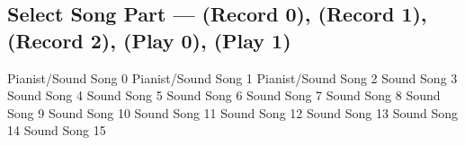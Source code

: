 \subsection[Select Song Part]{Select Song Part --- \UiKey{\I}\UiKey{\REC} (Record 0), \UiKey{\II}\UiKey{\REC} (Record 1), \UiKey{\I}\UiKey{\II}\UiKey{\REC} (Record 2), \UiKey{\I}\UiKey{\PL} (Play 0), \UiKey{\II}\UiKey{\PL} (Play 1)}
Pianist/Sound Song 0
Pianist/Sound Song 1
Pianist/Sound Song 2
Sound Song 3
Sound Song 4
Sound Song 5
Sound Song 6
Sound Song 7
Sound Song 8
Sound Song 9
Sound Song 10
Sound Song 11
Sound Song 12
Sound Song 13
Sound Song 14
Sound Song 15
